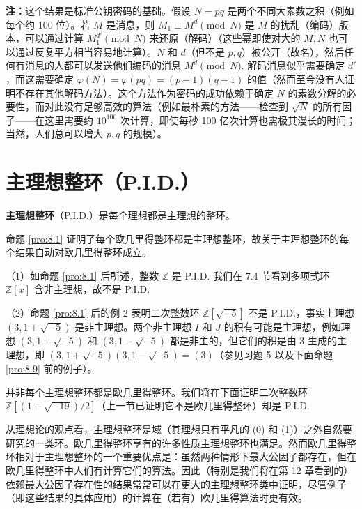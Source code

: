 \begin{enumerate}
\noindent\textbf{注：}这个结果是标准公钥密码的基础。假设 \(N = pq\) 是两个不同大素数之积（例如每个约 100 位）。若 \(M\) 是消息，则 \(M_1 \equiv M^d \pmod N\) 是 \(M\) 的扰乱（编码）版本，可以通过计算 \(M_1^{d'} \pmod N\) 来还原（解码）（这些幂即使对大的 \(M, N\) 也可以通过反复平方相当容易地计算）。\(N\) 和 \(d\)（但不是 \(p, q\)）被公开（故名），然后任何有消息的人都可以发送他们编码的消息 \(M^d \pmod N\). 解码消息似乎需要确定 \(d'\)，而这需要确定 \(\varphi(N) = \varphi(pq) = (p-1)(q-1)\) 的值（然而至今没有人证明不存在其他解码方法）。这个方法作为密码的成功依赖于确定 \(N\) 的素数分解的必要性，而对此没有足够高效的算法（例如最朴素的方法——检查到 \(\sqrt{N}\) 的所有因子——在这里需要约 \(10^{100}\) 次计算，即使每秒 100 亿次计算也需极其漫长的时间；当然，人们总可以增大 \(p, q\) 的规模）。
\end{enumerate}

\section{主理想整环（P.I.D.）}

\begin{definition}
\textbf{主理想整环}（P.I.D.）是每个理想都是主理想的整环。
\end{definition}

命题 \ref{pro:8.1} 证明了每个欧几里得整环都是主理想整环，故关于主理想整环的每个结果自动对欧几里得整环成立。

\begin{example}
（1）如命题 \ref{pro:8.1} 后所述，整数 \(\mathbb{Z}\) 是 P.I.D. 我们在 7.4 节看到多项式环 \(\mathbb{Z}[x]\) 含非主理想，故不是 P.I.D.

（2）命题 \ref{pro:8.1} 后的例 2 表明二次整数环 \(\mathbb{Z}[\sqrt{-5}]\) 不是 P.I.D.，事实上理想 \((3, 1+\sqrt{-5})\) 是非主理想。两个非主理想 \(I\) 和 \(J\) 的积有可能是主理想，例如理想 \((3, 1+\sqrt{-5})\) 和 \((3, 1-\sqrt{-5})\) 都是非主的，但它们的积是由 3 生成的主理想，即 \((3, 1+\sqrt{-5})(3, 1-\sqrt{-5}) = (3)\)（参见习题 5 以及下面命题 \ref{pro:8.9} 前的例子）。

并非每个主理想整环都是欧几里得整环。我们将在下面证明二次整数环 \(\mathbb{Z}[(1+\sqrt{-19})/2]\)（上一节已证明它不是欧几里得整环）却是 P.I.D.

从理想论的观点看，主理想整环是域（其理想只有平凡的 (0) 和 (1)）之外自然要研究的一类环。欧几里得整环享有的许多性质主理想整环也满足。然而欧几里得整环相对于主理想整环的一个重要优点是：虽然两种情形下最大公因子都存在，但在欧几里得整环中人们有计算它们的算法。因此（特别是我们将在第 12 章看到的）依赖最大公因子存在性的结果常常可以在更大的主理想整环类中证明，尽管例子（即这些结果的具体应用）的计算在（若有）欧几里得算法时更有效。
\end{example}

